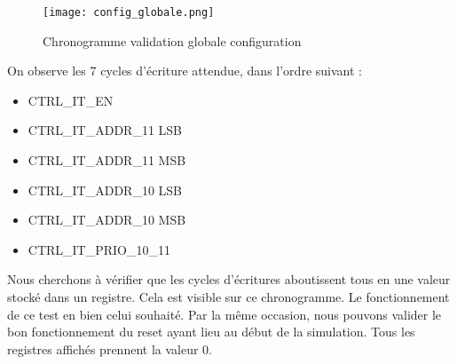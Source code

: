 \begin{figure}[H]
    \centering
    \texttt{[image: config\_globale.png]}
    \caption{Chronogramme validation globale configuration}
    \label{fig:chrono_config_globale}
\end{figure}
On observe les 7 cycles d'écriture attendue, dans l'ordre suivant : \vspace*{-3mm}
\begin{itemize}
    \item CTRL\_IT\_EN \vspace*{-3mm}
    \item CTRL\_IT\_ADDR\_11 LSB \vspace*{-3mm}
    \item CTRL\_IT\_ADDR\_11 MSB \vspace*{-3mm}
    \item CTRL\_IT\_ADDR\_10 LSB \vspace*{-3mm}
    \item CTRL\_IT\_ADDR\_10 MSB \vspace*{-3mm}
    \item  CTRL\_IT\_PRIO\_10\_11
\end{itemize}
Nous cherchons à vérifier que les cycles d'écritures aboutissent tous en une valeur stocké dans un registre.
Cela est visible sur ce chronogramme.
Le fonctionnement de ce test en bien celui souhaité.
Par la même occasion, nous pouvons valider le bon fonctionnement du reset ayant lieu au début de la simulation.
Tous les registres affichés prennent la valeur 0.

